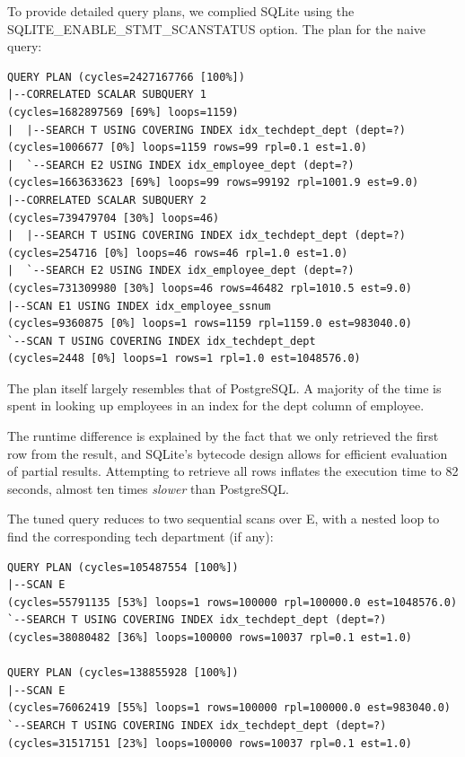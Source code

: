 \documentclass[11pt]{scrartcl}
\begin{document}
To provide detailed query plans, we complied SQLite using the SQLITE\_ENABLE\_STMT\_SCANSTATUS option.  The plan for the naive query:

{\small
\parskip0pt\begin{verbatim}
QUERY PLAN (cycles=2427167766 [100%])
|--CORRELATED SCALAR SUBQUERY 1                                    (cycles=1682897569 [69%] loops=1159)
|  |--SEARCH T USING COVERING INDEX idx_techdept_dept (dept=?)     (cycles=1006677 [0%] loops=1159 rows=99 rpl=0.1 est=1.0)
|  `--SEARCH E2 USING INDEX idx_employee_dept (dept=?)             (cycles=1663633623 [69%] loops=99 rows=99192 rpl=1001.9 est=9.0)
|--CORRELATED SCALAR SUBQUERY 2                                    (cycles=739479704 [30%] loops=46)
|  |--SEARCH T USING COVERING INDEX idx_techdept_dept (dept=?)     (cycles=254716 [0%] loops=46 rows=46 rpl=1.0 est=1.0)
|  `--SEARCH E2 USING INDEX idx_employee_dept (dept=?)             (cycles=731309980 [30%] loops=46 rows=46482 rpl=1010.5 est=9.0)
|--SCAN E1 USING INDEX idx_employee_ssnum                          (cycles=9360875 [0%] loops=1 rows=1159 rpl=1159.0 est=983040.0)
`--SCAN T USING COVERING INDEX idx_techdept_dept                   (cycles=2448 [0%] loops=1 rows=1 rpl=1.0 est=1048576.0)
\end{verbatim}}

The plan itself largely resembles that of PostgreSQL.  A majority of the time is spent in looking up employees in an index for the dept column of employee.

The runtime difference is explained by the fact that we only retrieved the first row from the result, and SQLite's bytecode design allows for efficient evaluation of partial results.  Attempting to retrieve all rows inflates the execution time to 82 seconds, almost ten times \textit{slower} than PostgreSQL.

The tuned query reduces to two sequential scans over E, with a nested loop to find the corresponding tech department (if any):

{\small
\parskip0pt\begin{verbatim}
QUERY PLAN (cycles=105487554 [100%])
|--SCAN E                                                       (cycles=55791135 [53%] loops=1 rows=100000 rpl=100000.0 est=1048576.0)
`--SEARCH T USING COVERING INDEX idx_techdept_dept (dept=?)     (cycles=38080482 [36%] loops=100000 rows=10037 rpl=0.1 est=1.0)

QUERY PLAN (cycles=138855928 [100%])
|--SCAN E                                                       (cycles=76062419 [55%] loops=1 rows=100000 rpl=100000.0 est=983040.0)
`--SEARCH T USING COVERING INDEX idx_techdept_dept (dept=?)     (cycles=31517151 [23%] loops=100000 rows=10037 rpl=0.1 est=1.0)
\end{verbatim}}
\end{document}
